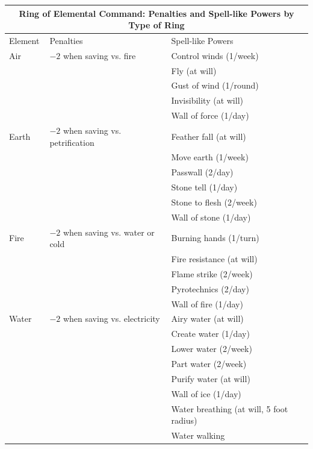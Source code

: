 \noindent
\begin{tabular}{|p{}|p{}|p{}|}
\multicolumn{3}{c}{Ring of Elemental Command: Penalties and Spell-like Powers by Type of Ring} \\
\hline
Element	& Penalties	& Spell-like Powers \\
\hline\hline
\rowcolor[gray]{.9}Air	& $-2$ when saving vs. fire	& Control winds (1/week) \\
\rowcolor[gray]{.9}& & Fly (at will) \\
\rowcolor[gray]{.9}& & Gust of wind (1/round) \\
\rowcolor[gray]{.9}& & Invisibility (at will) \\
\rowcolor[gray]{.9}& & Wall of force (1/day) \\
Earth	& $-2$ when saving vs. petrification	& Feather fall (at will) \\
& & Move earth (1/week) \\
& & Passwall (2/day) \\
& & Stone tell (1/day) \\
& & Stone to flesh (2/week) \\
& & Wall of stone (1/day) \\
\rowcolor[gray]{.9}Fire	& $-2$ when saving vs. water or cold	& Burning hands (1/turn) \\
\rowcolor[gray]{.9}& & Fire resistance (at will) \\
\rowcolor[gray]{.9}& & Flame strike (2/week) \\
\rowcolor[gray]{.9}& & Pyrotechnics (2/day) \\
\rowcolor[gray]{.9}& & Wall of fire (1/day) \\
Water	& $-2$ when saving vs. electricity	& Airy water (at will) \\
& & Create water (1/day) \\
& & Lower water (2/week) \\
& & Part water (2/week) \\
& & Purify water (at will) \\
& & Wall of ice (1/day) \\
& & Water breathing (at will, 5 foot radius) \\
& & Water walking \\
\hline
\end{tabular}

